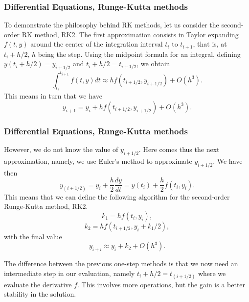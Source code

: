 \documentclass{beamer}
\begin{document}
\begin{frame}
\frametitle{Differential Equations, Runge-Kutta methods}

\begin{block}{}
To demonstrate the philosophy behind RK methods, let us consider
the second-order RK method, RK2.
The first approximation consists in Taylor expanding $f(t,y)$
around the center of the integration interval $t_i$ to $t_{i+1}$,
that is, at $t_i+h/2$, $h$ being the step.
Using the midpoint formula for an integral, 
defining $y(t_i+h/2) = y_{i+1/2}$ and   
$t_i+h/2 = t_{i+1/2}$, we obtain
\begin{equation}
    \int_{t_i}^{t_{i+1}} f(t,y) dt \approx hf(t_{i+1/2},y_{i+1/2}) +O(h^3).
\end{equation} 
This means in turn that we have
\begin{equation}
     y_{i+1}=y_i + hf(t_{i+1/2},y_{i+1/2}) +O(h^3).
\end{equation}
\end{block}
\end{frame}

\begin{frame}
\frametitle{Differential Equations, Runge-Kutta methods}

\begin{block}{}
However, we do not know the value of   $y_{i+1/2}$. Here comes thus the next approximation, namely, we use Euler's
method to approximate $y_{i+1/2}$. We have then
\begin{equation}
   y_{(i+1/2)}=y_i + \frac{h}{2}\frac{dy}{dt} =
   y(t_i) + \frac{h}{2}f(t_i,y_i).
\end{equation}
This means that we can define the following algorithm for 
the second-order Runge-Kutta method, RK2.
\begin{equation} 
  k_1=hf(t_i,y_i),
\end{equation} 
\begin{equation}
  k_2=hf(t_{i+1/2},y_i+k_1/2),
\end{equation}
with the final value
\begin{equation} 
  y_{i+i}\approx y_i + k_2 +O(h^3). 
\end{equation}

The difference between the previous one-step methods 
is that we now need an intermediate step in our evaluation,
namely $t_i+h/2 = t_{(i+1/2)}$ where we evaluate the derivative $f$. 
This involves more operations, but the gain is a better stability
in the solution.
\end{block}
\end{frame}
\end{document}
